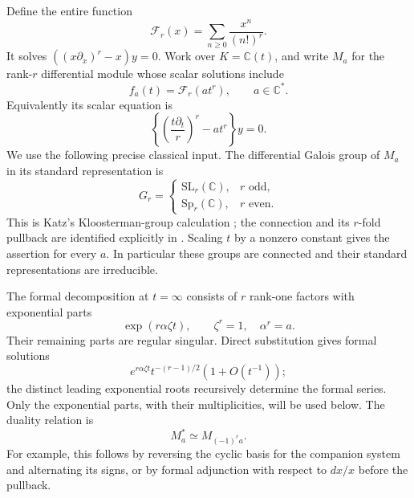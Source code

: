 \documentclass[11pt,a4paper]{article}
\theoremstyle{definition}
\theoremstyle{remark}
\numberwithin{equation}{section}
\begin{document}
Define the entire function
\[
 \mathcal F_r(x)=\sum_{n\ge0}\frac{x^n}{(n!)^r}.
\]
It solves $((x\partial_x)^r-x)y=0$. Work over $K=\mathbb C(t)$,
and write $M_a$ for the rank-$r$ differential module whose scalar
solutions include
\[
 f_a(t)=\mathcal F_r(a t^r),\qquad a\in\mathbb C^*.
\]
Equivalently its scalar equation is
\[
 \left\{\left(\frac{t\partial_t}{r}\right)^r-a t^r\right\}y=0.
\]
We use the following precise classical input. The differential Galois
group of $M_a$ in its standard representation is
\begin{equation}\label{p8:ac:katz}
 G_r=\begin{cases}\mathrm{SL}_r(\mathbb C),&r\text{ odd},\\
                    \mathrm{Sp}_r(\mathbb C),&r\text{ even}.
       \end{cases}
\end{equation}
This is Katz's Kloosterman-group calculation
\cite[Corollary 4.4.8]{p7:AW_Katz}; the connection and its $r$-fold
pullback are identified explicitly in
\cite[Proposition 2.4 and the proof of Proposition 2.7]{p6:FS_FSY2022}.
Scaling $t$ by a nonzero constant gives the assertion for every $a$.
In particular these groups are connected and their standard
representations are irreducible.

The formal decomposition at $t=\infty$ consists of $r$ rank-one
factors with exponential parts
\begin{equation}\label{p8:ac:exp}
 \exp(r\alpha\zeta t),\qquad \zeta^r=1,\quad\alpha^r=a.
\end{equation}
Their remaining parts are regular singular. Direct substitution gives
formal solutions
\[e^{r\alpha\zeta t}t^{-(r-1)/2}(1+O(t^{-1}));\]
the distinct leading exponential roots recursively determine the
formal series. Only the exponential parts, with their multiplicities,
will be used below. The duality relation is
\begin{equation}\label{p8:ac:dual}
 M_a^*\simeq M_{(-1)^r a}.
\end{equation}
For example, this follows by reversing the cyclic basis for the
companion system and alternating its signs, or by formal adjunction
with respect to $dx/x$ before the pullback.
\end{document}
